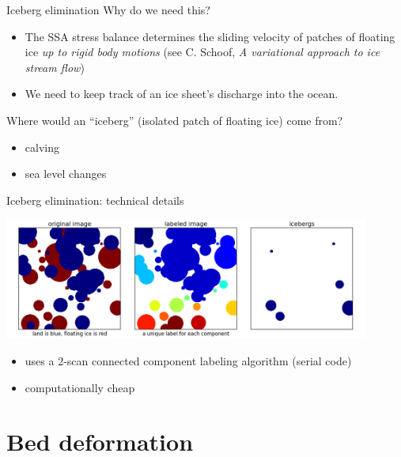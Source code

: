 \documentclass[hide notes,intlimits]{beamer}
\begin{document}
\begin{frame}{Iceberg elimination}
  Why do we need this?

  \begin{itemize}
  \item The SSA stress balance determines the sliding velocity of
    patches of floating ice \emph{up to rigid body motions} (see C.
    Schoof, \emph{A variational approach to ice stream flow})
  \item We need to keep track of an ice sheet's discharge into the
    ocean.
  \end{itemize}

  Where would an ``iceberg'' (isolated patch of floating ice) come
  from?
  \begin{itemize}
  \item calving
  \item sea level changes
  \end{itemize}
\end{frame}

\begin{frame}{Iceberg elimination: technical details}

  \begin{center}
    \includegraphics[width=0.9\textwidth]{icebergs.png}
  \end{center}

  \begin{itemize}
  \item uses a 2-scan connected component labeling algorithm (serial code)
  \item computationally cheap
  \end{itemize}
\end{frame}

\section{Bed deformation}
\label{sec:bed-deformation}
\end{document}
